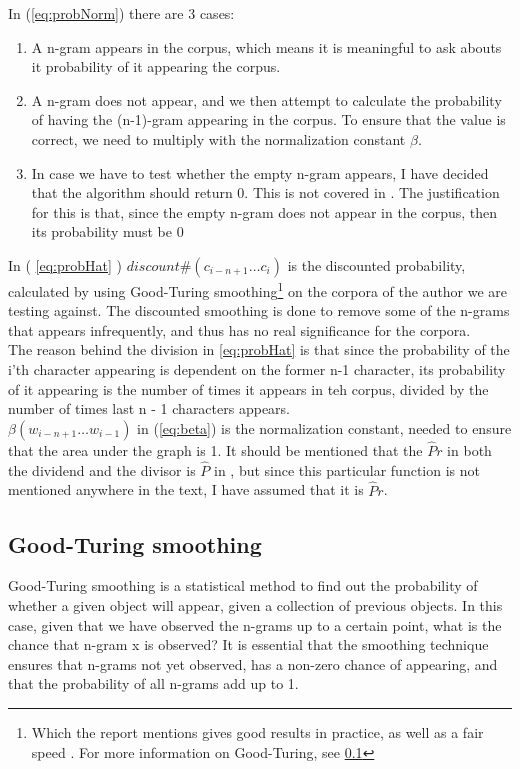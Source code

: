 In (\ref{eq:probNorm}) there are 3 cases:
\begin{enumerate}
\item A n-gram appears in the corpus, which means it is meaningful to ask abouts it probability of it appearing the corpus.
\item  A n-gram does not appear, and we then attempt to calculate the probability of having the (n-1)-gram appearing in the corpus. To ensure that the value is correct, we need to multiply with the normalization constant $\beta$. 
\item In case we have to test whether the empty n-gram appears, I have decided that the algorithm should return 0. This is not covered in \cite{nr4}. The justification for this is that, since the empty n-gram does not appear in the corpus, then its probability must be 0
\end{enumerate}
In ( \ref{eq:probHat} ) $discount\#(c_{i - n + 1} \ldots c_{i})$ 
is the discounted probability, calculated by using Good-Turing smoothing\footnote{Which the report mentions gives good results in practice, as well as a fair speed \cite{nr4}. For more information on Good-Turing, see \ref{Good-Turing}} on the corpora of the author we are testing against. The discounted smoothing is done to remove some of the n-grams that appears infrequently, and thus has no real significance for the corpora.\\

The reason behind the division in \ref{eq:probHat} is that since the probability of the i'th character appearing is dependent on the former n-1 character, its probability of it appearing is the number of times it appears in teh corpus, divided by the number of times last n - 1 characters appears.\\

$\beta (w_{i - n + 1}\ldots w_{i -1})$ in (\ref{eq:beta}) is the normalization constant, needed to ensure that the area under the graph is 1. It should be mentioned that the $\hat{P}r$ in both the dividend and the divisor is $\hat{P}$ in \cite{nr4}, but since this particular function is not mentioned anywhere in the text, I have assumed that it is $\hat{P}r$.


\subsection{Good-Turing smoothing}
\label{Good-Turing}
Good-Turing smoothing is a statistical method to find out the probability of whether a given object will appear, given a collection of previous objects. In this case, given that we have observed the n-grams up to a certain point, what is the chance that n-gram x is observed? It is essential that the smoothing technique ensures that n-grams not yet observed, has a non-zero chance of appearing, and that the probability of all n-grams add up to 1.\\

